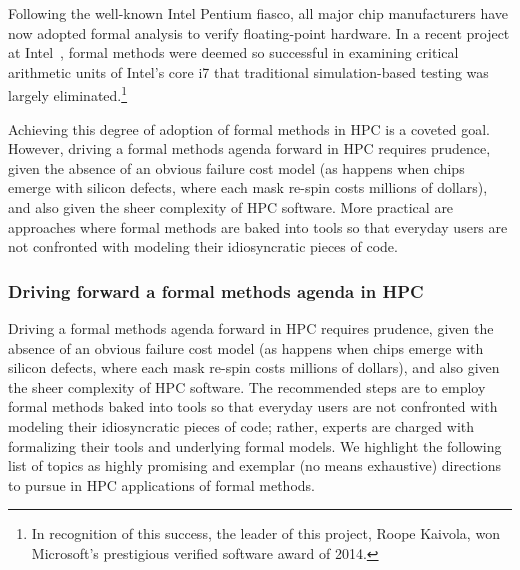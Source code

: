 Following the well-known Intel Pentium fiasco, all major chip manufacturers 
 have now adopted formal analysis to
 verify floating-point hardware.
 In a recent project at Intel~\cite{roope-intel-fv-i7}, formal methods were deemed so
 successful in examining critical arithmetic units of Intel's core i7 that
 traditional simulation-based testing was largely eliminated.\footnote{In recognition of this success, the leader of
 this project,
 Roope Kaivola, won Microsoft's prestigious verified software award of 2014.}
 
 
 Achieving this degree of adoption of formal
 methods in HPC is a coveted goal.
 However, driving a formal methods agenda forward in HPC requires prudence, given the absence of an obvious failure cost model (as happens when chips emerge with silicon defects, where each mask re-spin costs millions of dollars), and
also given the sheer complexity of 
HPC software.
%
More practical are approaches where 
formal methods are baked into tools so that
everyday users are not confronted with
modeling their idiosyncratic pieces of
code.
 

\subsubsection{Driving forward a formal methods agenda in HPC}

Driving a formal methods agenda forward in HPC requires prudence, given the absence of an obvious failure cost model (as happens when chips emerge with silicon defects, where each mask re-spin costs millions of dollars), and
also given the sheer complexity of 
HPC software.
%
The recommended steps are to employ
formal methods baked into tools so that
everyday users are not confronted with
modeling their idiosyncratic pieces of
code; rather, experts are charged with
formalizing their tools and underlying 
formal models.
%
We highlight the following list of topics
as highly promising and 
exemplar (no means exhaustive) directions
to pursue in HPC applications of formal
methods.

